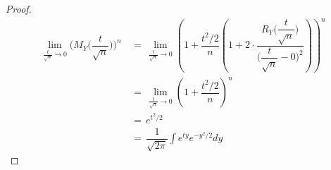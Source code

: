 \begin{theorem}
\begin{proof}
        \begin{align*}
            \lim_{\frac{t}{\sqrt{n}} \longrightarrow 0} \Big(M_{Y} \Big(\dfrac{t}{\sqrt{n}}\Big)\Big)^{n} \hspace{2pt} &= \hspace{2pt} \lim_{\frac{t}{\sqrt{n}} \longrightarrow 0} \left(1 + \dfrac{t^{2}/2}{n} \left(1 + 2 \cdot \dfrac{R_{Y} \Big(\dfrac{t}{\sqrt{n}}\Big)}{\Big(\dfrac{t}{\sqrt{n}} - 0\Big)^{2}}\right)\right)^{n} \\[1ex]
            &= \hspace{2pt} \lim_{\frac{t}{\sqrt{n}} \longrightarrow 0} \left(1 + \dfrac{t^{2}/2}{n} \right)^{n} \\[1ex]
            &= \hspace{2pt} e^{t^{2}/2} \\[1ex]
            &= \hspace{2pt} \dfrac{1}{\sqrt{2\pi}} \int e^{ty} e^{-y^{2}/2} dy
        \end{align*}
    \end{proof}
\end{theorem}